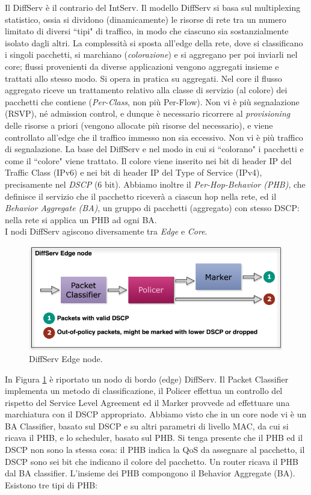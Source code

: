 Il DiffServ è il contrario del IntServ. Il modello DiffServ si basa sul multiplexing statistico, ossia si dividono (dinamicamente) le risorse di rete tra un numero limitato di diversi \textquotedblleft tipi" di traffico, in modo che ciascuno sia sostanzialmente isolato dagli altri. La complessità si sposta all'edge della rete, dove si classificano i singoli pacchetti, si marchiano (\textit{colorazione}) e si aggregano per poi inviarli nel core; flussi provenienti da diverse applicazioni vengono aggregati insieme e trattati allo stesso modo. Si opera in pratica su aggregati. Nel core il flusso aggregato riceve un trattamento relativo alla classe di servizio (al colore) dei pacchetti che contiene (\textit{Per-Class}, non più Per-Flow). Non vi è più segnalazione (RSVP), né admission control, e dunque è necessario ricorrere al \textit{provisioning} delle risorse a priori (vengono allocate più risorse del necessario), e viene controllato all'edge che il traffico immesso non sia eccessivo. Non vi è più traffico di segnalazione. La base del DiffServ e nel modo in cui si \textquotedblleft colorano" i pacchetti e come il \textquotedblleft colore" viene trattato. Il colore viene inserito nei bit di header IP del Traffic Class (IPv6) e nei bit di header IP del Type of Service (IPv4), precisamente nel \textit{DSCP} (6 bit). Abbiamo inoltre il \textit{Per-Hop-Behavior (PHB)}, che definisce il servizio che il pacchetto riceverà a ciascun hop nella rete, ed il \textit{Behavior Aggregate (BA)}, un  gruppo di pacchetti (aggregato) con stesso DSCP: nella rete si applica un PHB ad ogni BA.\\
I nodi DiffServ agiscono diversamente tra \textit{Edge} e \textit{Core}.
\begin{figure}[htbp]
	\centering
	\includegraphics[scale = 0.4]{images/diffserv-edge-node}
	\caption{DiffServ Edge node.}
	\label{img:diffserv-edge-node}
\end{figure}
In Figura \ref{img:diffserv-edge-node} è riportato un nodo di bordo (edge) DiffServ. Il Packet Classifier implementa un metodo di classificazione, il Policer effettua un controllo del rispetto del Service Level Agreement ed il Marker provvede ad effettuare una marchiatura con il DSCP appropriato. Abbiamo visto che in un core node vi è un BA Classifier, basato sul DSCP e su altri parametri di livello MAC, da cui si ricava il PHB, e lo scheduler, basato sul PHB. Si tenga presente che il PHB ed il DSCP non sono la stessa cosa: il PHB indica la QoS da assegnare al pacchetto, il DSCP sono sei bit che indicano il colore del pacchetto. Un router ricava il PHB dal BA classifier. L'insieme dei PHB compongono il Behavior Aggregate (BA). Esistono tre tipi di PHB:
